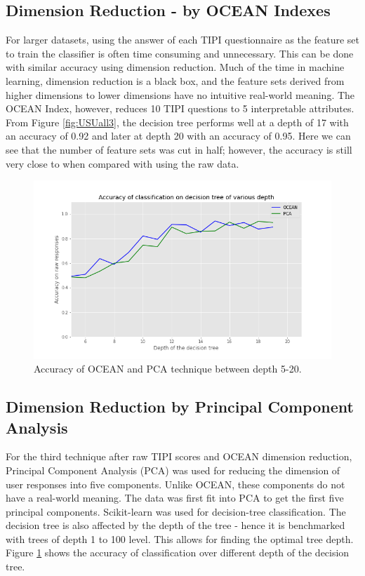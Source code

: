 \documentclass[conference]{IEEEtran}
\begin{document}
\subsection{Dimension Reduction - by OCEAN Indexes}\label{subsec4}
For larger datasets, using the answer of each TIPI questionnaire as the feature
set to train the classifier is often time consuming and unnecessary. This can be done
with similar accuracy using dimension reduction. Much of the time in machine learning,
dimension reduction is a black box, and the feature sets derived from higher dimensions
to lower dimensions have no intuitive real-world meaning. The OCEAN Index,
however, reduces 10 TIPI questions to 5 interpretable attributes.
From Figure \ref{fig:USUall3}, the decision tree performs well at a depth of 17 with an accuracy of 0.92
and later at depth 20 with an accuracy of 0.95. Here we can see that the number of
feature sets was cut in half; however, the accuracy is still very close to when compared
with using the raw data.

\begin{figure}[h]
\includegraphics[scale=0.35]{figs/zoomed2.png}
\caption{Accuracy of OCEAN and PCA technique between depth 5-20.}
\label{fig:zoomed2}
\centering
\end{figure}

\subsection{Dimension Reduction by Principal Component Analysis}\label{subsec4}
For the third technique after raw TIPI scores and OCEAN dimension reduction,
Principal Component Analysis (PCA) was used for reducing the dimension of user
responses into five components. Unlike OCEAN, these components do not have a real-world meaning.
The data was first fit into PCA to get the first five principal components. Scikit-learn
was used for decision-tree classification.
The decision tree is also affected by the depth of the tree - hence it is benchmarked with
trees of depth 1 to 100 level. This allows for finding the optimal tree depth. Figure \ref{fig:zoomed2}
shows the accuracy of classification over different depth of the decision tree.
\end{document}
